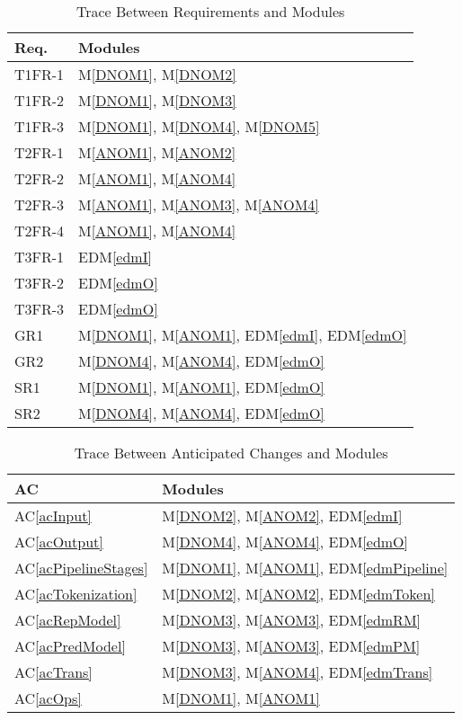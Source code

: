\documentclass[12pt, titlepage]{article}
\newcommand{\acref}[1]{AC\ref{#1}}
\newcommand{\mref}[1]{M\ref{#1}}
\newcommand{\edmref}[1]{EDM\ref{#1}}
\begin{document}
\begin{table}[H]
\centering
\begin{tabular}{p{} p{}}
\toprule
\textbf{Req.} & \textbf{Modules}\\
\midrule
T1FR-1 & \mref{DNOM1}, \mref{DNOM2}\\
T1FR-2 & \mref{DNOM1}, \mref{DNOM3}\\
T1FR-3 & \mref{DNOM1}, \mref{DNOM4}, \mref{DNOM5}\\
T2FR-1 & \mref{ANOM1}, \mref{ANOM2}\\
T2FR-2 & \mref{ANOM1}, \mref{ANOM4}\\
T2FR-3 & \mref{ANOM1}, \mref{ANOM3}, \mref{ANOM4}\\
T2FR-4 & \mref{ANOM1}, \mref{ANOM4}\\
T3FR-1 & \edmref{edmI}\\
T3FR-2 & \edmref{edmO}\\
T3FR-3 & \edmref{edmO}\\
GR1 & \mref{DNOM1}, \mref{ANOM1}, \edmref{edmI}, \edmref{edmO}\\
GR2 & \mref{DNOM4}, \mref{ANOM4}, \edmref{edmO}\\
SR1 & \mref{DNOM1}, \mref{ANOM1}, \edmref{edmO}\\
SR2 & \mref{DNOM4}, \mref{ANOM4}, \edmref{edmO}\\

\bottomrule
\end{tabular}
\caption{Trace Between Requirements and Modules}
\label{TblRT}
\end{table}

\begin{table}[H]
\centering
\begin{tabular}{p{} p{}}
\toprule
\textbf{AC} & \textbf{Modules}\\
\midrule
\acref{acInput} & \mref{DNOM2}, \mref{ANOM2}, \edmref{edmI}\\
\acref{acOutput} & \mref{DNOM4}, \mref{ANOM4}, \edmref{edmO}\\
\acref{acPipelineStages} & \mref{DNOM1}, \mref{ANOM1}, \edmref{edmPipeline}\\
\acref{acTokenization} & \mref{DNOM2}, \mref{ANOM2}, \edmref{edmToken}\\
\acref{acRepModel} & \mref{DNOM3}, \mref{ANOM3}, \edmref{edmRM}\\
\acref{acPredModel} & \mref{DNOM3}, \mref{ANOM3}, \edmref{edmPM}\\
\acref{acTrans} & \mref{DNOM3}, \mref{ANOM4}, \edmref{edmTrans}\\
\acref{acOps} & \mref{DNOM1}, \mref{ANOM1}\\

\bottomrule
\end{tabular}
\caption{Trace Between Anticipated Changes and Modules}
\label{TblACT}
\end{table}
\end{document}
